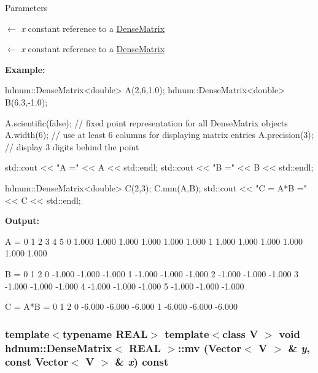 \begin{DoxyParams}{Parameters}
\item[\mbox{$\leftarrow$} {\em x}]constant reference to a \hyperlink{classhdnum_1_1DenseMatrix}{DenseMatrix} \item[\mbox{$\leftarrow$} {\em x}]constant reference to a \hyperlink{classhdnum_1_1DenseMatrix}{DenseMatrix}\end{DoxyParams}
{\bfseries Example:} 
\begin{DoxyCode}
  hdnum::DenseMatrix<double> A(2,6,1.0);
  hdnum::DenseMatrix<double> B(6,3,-1.0);

  A.scientific(false); // fixed point representation for all DenseMatrix objects
  A.width(6);          // use at least 6 columns for displaying matrix entries
  A.precision(3);      // display 3 digits behind the point 

  std::cout << "A =" << A << std::endl;
  std::cout << "B =" << B << std::endl;

  hdnum::DenseMatrix<double> C(2,3);
  C.mm(A,B);
  std::cout << "C = A*B =" << C << std::endl;
\end{DoxyCode}


{\bfseries Output:} \begin{DoxyVerb}
A =
                  0      1      2      3      4      5 
          0   1.000  1.000  1.000  1.000  1.000  1.000 
          1   1.000  1.000  1.000  1.000  1.000  1.000 

B =
                  0      1      2 
          0  -1.000 -1.000 -1.000 
          1  -1.000 -1.000 -1.000 
          2  -1.000 -1.000 -1.000 
          3  -1.000 -1.000 -1.000 
          4  -1.000 -1.000 -1.000 
          5  -1.000 -1.000 -1.000 

C = A*B =
                  0      1      2 
          0  -6.000 -6.000 -6.000 
          1  -6.000 -6.000 -6.000 
	  \end{DoxyVerb}
 \hypertarget{classhdnum_1_1DenseMatrix_a63a0aa62c65545ae7aeee7a44e10568e}{
\subsubsection[{mv}]{\setlength{\rightskip}{0pt plus 5cm}template$<$typename REAL$>$ template$<$class V $>$ void {\bf hdnum::DenseMatrix}$<$ REAL $>$::mv ({\bf Vector}$<$ V $>$ \& {\em y}, \/  const {\bf Vector}$<$ V $>$ \& {\em x}) const}}
\label{classhdnum_1_1DenseMatrix_a63a0aa62c65545ae7aeee7a44e10568e}


